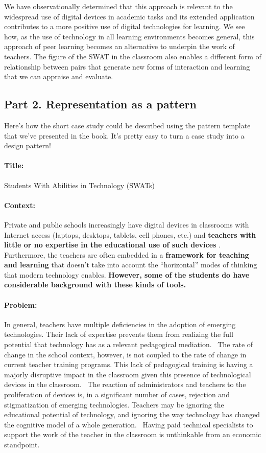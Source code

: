 We have observationally determined that this approach is relevant to the
widespread use of digital devices in academic tasks and its extended
application contributes to a more positive use of digital technologies
for learning. We see how, as the use of technology in all learning
environments becomes general, this approach of peer learning becomes an
alternative to underpin the work of teachers. The figure of the SWAT in
the classroom also enables a different form of relationship between
pairs that generate new forms of interaction and learning that we can
appraise and evaluate.

\subsection{Part 2. Representation as a pattern}

Here's how the short case study could be described using the pattern
template that we've presented in the book.  It's pretty easy to turn a
case study into a design pattern!

\paragraph{Title:} Students With Abilities in Technology (SWATs)

\paragraph{Context:}
Private and public schools increasingly have digital devices in
classrooms with Internet access (laptops, desktops, tablets, cell
phones, etc.) and \textbf{teachers with little or no expertise in the
  educational use of such devices} . Furthermore, the teachers are
often embedded in a \textbf{framework for teaching and learning} that
doesn't take into account the ``horizontal'' modes of thinking that
modern technology enables.  \textbf{However, some of the students do
  have considerable background with these kinds of tools.}

\paragraph{Problem:}
In general, teachers have multiple deficiencies in the adoption of
emerging technologies. Their lack of expertise prevents them from
realizing the full potential that technology has as a relevant
pedagogical mediation. ~The rate of change in the school context,
however, is not coupled to the rate of change in current teacher
training programs. This lack of pedagogical training is having a
majorly disruptive impact in the classroom given this presence of
technological devices in the classroom. ~The reaction of
administrators and teachers to the proliferation of devices is, in a
significant number of cases, rejection and stigmatization of emerging
technologies.  Teachers may be ignoring the educational potential of
technology, and ignoring the way technology has changed the cognitive
model of a whole generation. ~Having paid technical specialists to
support the work of the teacher in the classroom is unthinkable from
an economic standpoint.

